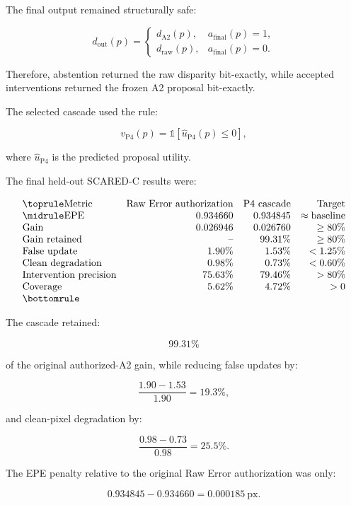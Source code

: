 \documentclass[11pt,a4paper]{article}
\begin{document}
The final output remained structurally safe:

\[
d_{\mathrm{out}}(p)
=
\begin{cases}
d_{\mathrm{A2}}(p), & a_{\mathrm{final}}(p)=1,\\
d_{\mathrm{raw}}(p), & a_{\mathrm{final}}(p)=0.
\end{cases}
\]

Therefore, abstention returned the raw disparity bit-exactly, while accepted interventions returned the frozen A2 proposal bit-exactly.

The selected cascade used the rule:

\[
v_{\mathrm{P4}}(p)
=
\mathbb{1}
\left[
\hat u_{\mathrm{P4}}(p)\leq 0
\right],
\]

where \(\hat u_{\mathrm{P4}}\) is the predicted proposal utility.

The final held-out SCARED-C results were:

\[
\begin{array}{lrrr}
\toprule
\text{Metric}
&
\text{Raw Error authorization}
&
\text{P4 cascade}
&
\text{Target}
\\
\midrule
\text{EPE}
& 0.934660 & 0.934845 & \approx \text{baseline}
\\
\text{Gain}
& 0.026946 & 0.026760 & \geq 80\%
\\
\text{Gain retained}
& \text{--} & 99.31\% & \geq 80\%
\\
\text{False update}
& 1.90\% & 1.53\% & <1.25\%
\\
\text{Clean degradation}
& 0.98\% & 0.73\% & <0.60\%
\\
\text{Intervention precision}
& 75.63\% & 79.46\% & >80\%
\\
\text{Coverage}
& 5.62\% & 4.72\% & >0
\\
\bottomrule
\end{array}
\]

The cascade retained:

\[
99.31\%
\]

of the original authorized-A2 gain, while reducing false updates by:

\[
\frac{1.90-1.53}{1.90}
=
19.3\%,
\]

and clean-pixel degradation by:

\[
\frac{0.98-0.73}{0.98}
=
25.5\%.
\]

The EPE penalty relative to the original Raw Error authorization was only:

\[
0.934845-0.934660
=
0.000185\ \mathrm{px}.
\]
\end{document}
